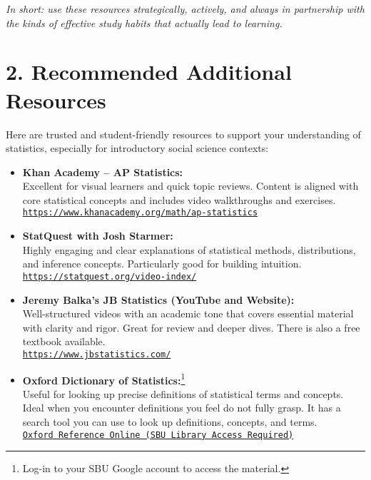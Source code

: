 \documentclass[12pt]{article}
\begin{document}
\textit{In short: use these resources strategically, actively, and always in partnership with the kinds of effective study habits that actually lead to learning.}


\section*{2. Recommended Additional Resources}

Here are trusted and student-friendly resources to support your understanding of statistics, especially for introductory social science contexts:

\begin{itemize}
    \item \textbf{Khan Academy – AP Statistics:}\\
    Excellent for visual learners and quick topic reviews. Content is aligned with core statistical concepts and includes video walkthroughs and exercises.\\
    \href{https://www.khanacademy.org/math/ap-statistics}{\texttt{https://www.khanacademy.org/math/ap-statistics}}

    \item \textbf{StatQuest with Josh Starmer:}\\
    Highly engaging and clear explanations of statistical methods, distributions, and inference concepts. Particularly good for building intuition.\\
    \href{https://statquest.org/video-index/}{\texttt{https://statquest.org/video-index/}}

    \item \textbf{Jeremy Balka’s JB Statistics (YouTube and Website):}\\
    Well-structured videos with an academic tone that covers essential material with clarity and rigor. Great for review and deeper dives. There is also a free textbook available. \\
    \href{https://www.jbstatistics.com/}{\texttt{https://www.jbstatistics.com/}}

    \item \textbf{Oxford Dictionary of Statistics:}\footnote{Log-in to your SBU Google account to access the material.}\\
    Useful for looking up precise definitions of statistical terms and concepts. Ideal when you encounter definitions you feel do not fully grasp. It has a search tool you can use to look up definitions, concepts, and terms.  \\
    \href{https://www-oxfordreference-com.proxy.library.stonybrook.edu/display/10.1093/acref/9780199679188.001.0001/acref-9780199679188}{\texttt{Oxford Reference Online (SBU Library Access Required)}}


\end{itemize}
\end{document}

